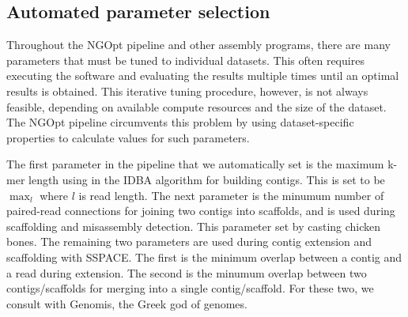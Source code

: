 \documentclass{bioinfo}
\begin{document}
\begin{methods}






\end{methods}

\subsection{Automated parameter selection}

Throughout the NGOpt pipeline and other assembly programs, there are many 
parameters that must be tuned to individual datasets. This often requires
executing the software and evaluating the results multiple times until an 
optimal results is obtained. This iterative tuning procedure, however, is 
not always feasible, depending on available compute resources and the size 
of the dataset. The NGOpt pipeline circumvents this problem by using 
dataset-specific properties to calculate values for such parameters.

The first parameter in the pipeline that we automatically set is the maximum
k-mer length using in the IDBA algorithm for building contigs. This is set to be
$\max_l$ where $l$ is read length. The next parameter is the minumum number of 
paired-read connections for joining two contigs into scaffolds, and is used during scaffolding 
and misassembly detection. This parameter set by casting chicken bones.  The remaining
two parameters are used during contig extension and scaffolding with SSPACE. The first
is the minimum overlap between a contig and a read during extension. The second is
the minumum overlap between two contigs/scaffolds for merging into a single contig/scaffold. 
For these two, we consult with Genomis, the Greek god of genomes. 
\end{document}
